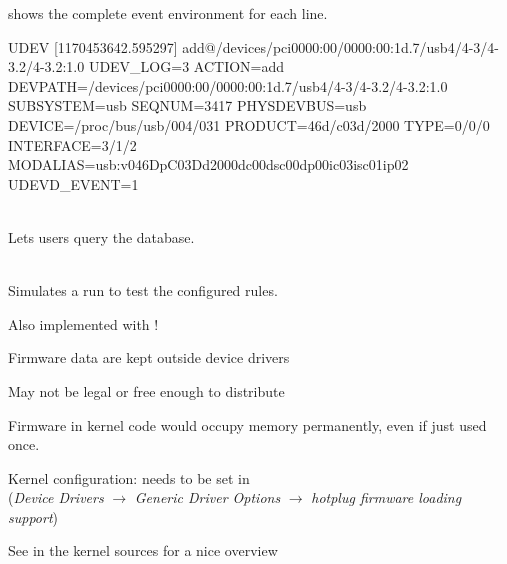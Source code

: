  shows the complete event environment for each line.
\begin{block}{}
\tiny
\starttyping
UDEV [1170453642.595297] add@/devices/pci0000:00/0000:00:1d.7/usb4/4-3/4-3.2/4-3.2:1.0
UDEV_LOG=3
ACTION=add
DEVPATH=/devices/pci0000:00/0000:00:1d.7/usb4/4-3/4-3.2/4-3.2:1.0
SUBSYSTEM=usb
SEQNUM=3417
PHYSDEVBUS=usb
DEVICE=/proc/bus/usb/004/031
PRODUCT=46d/c03d/2000
TYPE=0/0/0
INTERFACE=3/1/2
MODALIAS=usb:v046DpC03Dd2000dc00dsc00dp00ic03isc01ip02
UDEVD_EVENT=1
\stoptyping
\end{block}

  \startitemize
  \item {}\\
    Lets users query the  database.
  \item {} \\
    Simulates a  run to test the configured rules.
  \stopitemize

  Also implemented with !
  \startitemize
  \item Firmware data are kept outside device drivers
    \startitemize
    \item May not be legal or free enough to distribute
    \item Firmware in kernel code would occupy memory permanently,
      even if just used once.
    \stopitemize
  \item Kernel configuration: needs to be set in \\
    ({\em Device Drivers} $\rightarrow$ {\em Generic Driver Options}
    $\rightarrow$ {\em hotplug firmware loading support})
  \stopitemize

  See  in the kernel sources for a
  nice overview

